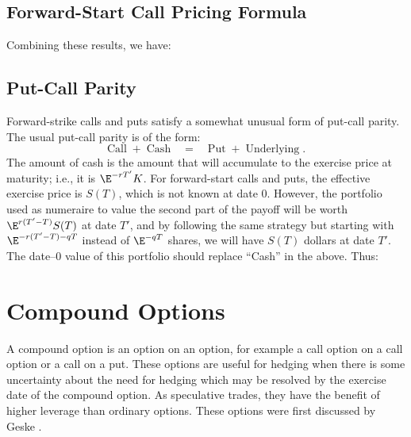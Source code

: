 \subsection*{Forward-Start Call Pricing Formula}
Combining these results, we have:

\subsection*{Put-Call Parity}

\next Forward-strike calls and puts satisfy a somewhat unusual form of put-call parity.  The usual put-call parity is of the form:
$$\text{Call} \;+\; \text{Cash} \quad = \quad \text{Put} \;+ \;\text{Underlying}\; .$$
The amount of cash is the amount that will accumulate to the exercise price at maturity; i.e., it is $\E^{-rT'}K$.  For forward-start calls and puts, the effective exercise price is $S(T)$, which is not known at date 0.  However, the portfolio used as numeraire to value the second part of the payoff will be worth $\E^{r(T'-T)}S(T)$ at date $T'$, and by following the same strategy but starting with $\E^{-r(T'-T)-qT}$ instead of $\E^{-qT}$ shares, we will have $S(T)$ dollars at date $T'$.  The date--0 value of this portfolio should replace ``Cash'' in the above.  Thus:


\section{Compound Options}

A compound option  is an option on an option, for example a call option on a call option or a call on a put.   These options are useful for hedging when there is some uncertainty about the need for hedging which may be resolved by the exercise date of the compound option.  As speculative trades, they have the benefit of higher leverage than ordinary options.  These options were first discussed by Geske \cite{Geske}.

